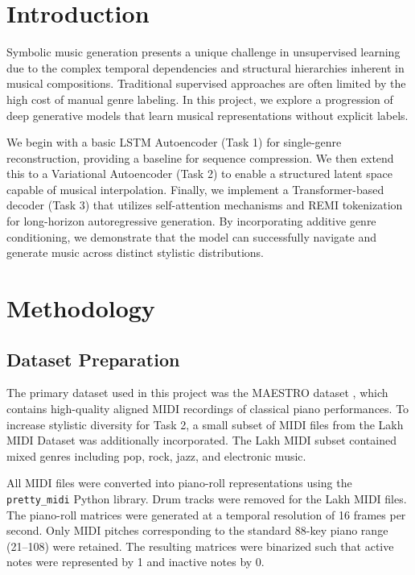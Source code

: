 \documentclass{article}
\theoremstyle{plain}
\theoremstyle{definition}
\theoremstyle{remark}
\begin{document}
\section{Introduction}

Symbolic music generation presents a unique challenge in unsupervised learning due to the complex temporal dependencies and structural hierarchies inherent in musical compositions. Traditional supervised approaches are often limited by the high cost of manual genre labeling. In this project, we explore a progression of deep generative models that learn musical representations without explicit labels.

We begin with a basic LSTM Autoencoder (Task 1) for single-genre reconstruction, providing a baseline for sequence compression. We then extend this to a Variational Autoencoder (Task 2) to enable a structured latent space capable of musical interpolation. Finally, we implement a Transformer-based decoder (Task 3) that utilizes self-attention mechanisms and REMI tokenization for long-horizon autoregressive generation. By incorporating additive genre conditioning, we demonstrate that the model can successfully navigate and generate music across distinct stylistic distributions.

\section{Methodology}
\subsection{Dataset Preparation}

The primary dataset used in this project was the MAESTRO dataset \cite{maestro_dataset}, which contains high-quality aligned MIDI recordings of classical piano performances. To increase stylistic diversity for Task 2, a small subset of MIDI files from the Lakh MIDI Dataset \cite{lakh_dataset} was additionally incorporated. The Lakh MIDI subset contained mixed genres including pop, rock, jazz, and electronic music.

All MIDI files were converted into piano-roll representations using the \texttt{pretty\_midi} Python library. Drum tracks were removed for the Lakh MIDI files. The piano-roll matrices were generated at a temporal resolution of 16 frames per second. Only MIDI pitches corresponding to the standard 88-key piano range (21--108) were retained. The resulting matrices were binarized such that active notes were represented by 1 and inactive notes by 0.
\end{document}
